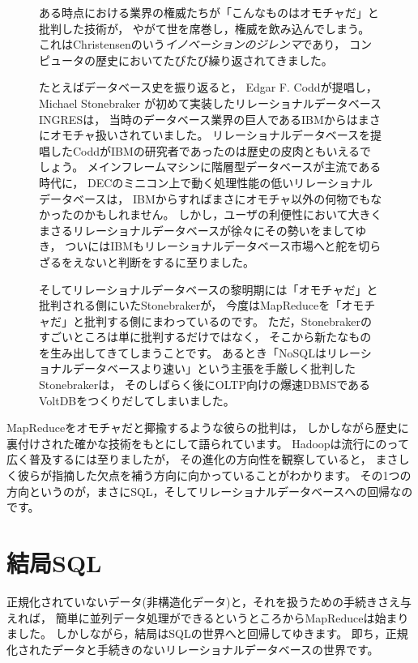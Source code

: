 \begin{figure}[t]
\begin{screen}
 \vspace*{3mm}

 ある時点における業界の権威たちが「こんなものはオモチャだ」と批判した技術が，
 やがて世を席巻し，権威を飲み込んでしまう。
 これはChristensenのいう{\em イノベーションのジレンマ}であり，
 コンピュータの歴史においてたびたび繰り返されてきました。

 たとえばデータベース史を振り返ると，
 Edgar F. Coddが提唱し，
 Michael Stonebraker が初めて実装したリレーショナルデータベースINGRESは，
 当時のデータベース業界の巨人であるIBMからはまさにオモチャ扱いされていました。
 リレーショナルデータベースを提唱したCoddがIBMの研究者であったのは歴史の皮肉ともいえるでしょう。
 メインフレームマシンに階層型データベースが主流である時代に，
 DECのミニコン上で動く処理性能の低いリレーショナルデータベースは，
 IBMからすればまさにオモチャ以外の何物でもなかったのかもしれません。
 しかし，ユーザの利便性において大きくまさるリレーショナルデータベースが徐々にその勢いをましてゆき，
 ついにはIBMもリレーショナルデータベース市場へと舵を切らざるをえないと判断をするに至りました。

 そしてリレーショナルデータベースの黎明期には「オモチャだ」と批判される側にいたStonebrakerが，
 今度はMapReduceを「オモチャだ」と批判する側にまわっているのです。
 ただ，Stonebrakerのすごいところは単に批判するだけではなく，
 そこから新たなものを生み出してきてしまうことです。
 あるとき「NoSQLはリレーショナルデータベースより速い」という主張を手厳しく批判したStonebrakerは，
 そのしばらく後にOLTP向けの爆速DBMSであるVoltDBをつくりだしてしまいました。
\end{screen}
\end{figure}

MapReduceをオモチャだと揶揄するような彼らの批判は，
しかしながら歴史に裏付けされた確かな技術をもとにして語られています。
Hadoopは流行にのって広く普及するには至りましたが，
その進化の方向性を観察していると，
まさしく彼らが指摘した欠点を補う方向に向かっていることがわかります。
その1つの方向というのが，まさにSQL，そしてリレーショナルデータベースへの回帰なのです。

\section{結局SQL}

正規化されていないデータ(非構造化データ)と，それを扱うための手続きさえ与えれば，
簡単に並列データ処理ができるというところからMapReduceは始まりました。
しかしながら，結局はSQLの世界へと回帰してゆきます。
即ち，正規化されたデータと手続きのないリレーショナルデータベースの世界です。

